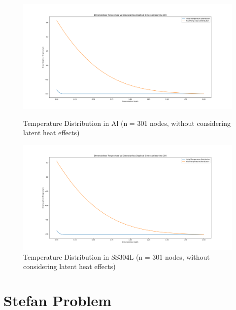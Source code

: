 \begin{figure}[h]
\centering
  \includegraphics[width=15cm]{img/Temperature_Distribution_in_crystalline_material_Without Latent_Heat_Effects.png}
  \caption{Temperature Distribution in Al (n = 301 nodes, without considering latent heat effects)}
  \label{fig:Temperature Distribution in AL}


  \centering
  \includegraphics[width=15cm]{img/Temperature_Distribution_Amorphous.png}
  \caption{Temperature Distribution in SS304L (n = 301 nodes, without considering latent heat effects)}
  \label{fig:Temperature Distribution in SS304}
  
\end{figure}


\newpage
\section{Stefan Problem\label{sec:implaspects}}

